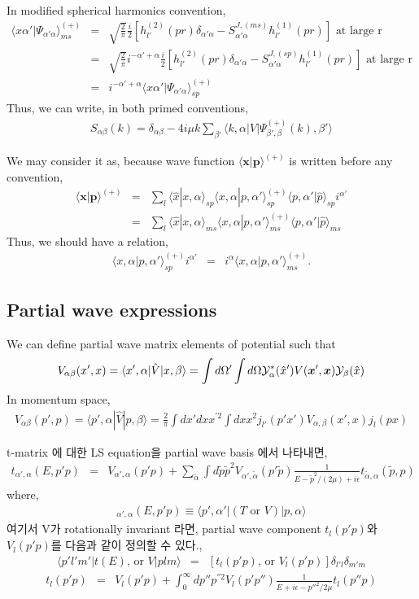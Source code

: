 \documentclass[10pt]{book}
\def\bm{\boldsymbol}
\newcommand{\bea}{\begin{eqnarray}}
\newcommand{\eea}{\end{eqnarray}}
\newcommand{\no}{\nonumber \\}
\def\vp{{\bm p}}
\def\vx{{\bm x}}
\def\la{\langle}
\def\ra{\rangle}
\begin{document}
\begin{itemize}
In modified spherical harmonics convention,
\bea
\la x \alpha'|\Psi_{\alpha'\alpha}\ra^{(+)}_{ms}
&=&\sqrt{\frac{2}{\pi}}
    \frac{i}{2}[h^{(2)}_{l'}(pr)\delta_{\alpha'\alpha}
                      -S^{J,(ms)}_{\alpha'\alpha} 
                      h^{(1)}_{l'}(pr)] 
                      \mbox{ at large r}\no
&=&\sqrt{\frac{2}{\pi}}
   i^{-\alpha'+\alpha} \frac{i}{2}
                  [h^{(2)}_{l'}(pr)\delta_{\alpha'\alpha}
                      -S^{J,(sp)}_{\alpha'\alpha} 
                      h^{(1)}_{l'}(pr)] 
                      \mbox{ at large r}\no
&=&i^{-\alpha'+\alpha}\la x \alpha'|\Psi_{\alpha'\alpha}\ra^{(+)}_{sp}
\eea
Thus, we can write, in both primed conventions,
\bea
S_{\alpha\beta}(k)=\delta_{\alpha\beta}-4i\mu k
 \sum_{\beta'}\la k, \alpha|V|\Psi^{(+)}_{\beta',\beta}(k),\beta'\ra
\eea

We may consider it as, because wave function 
$\la\vx|\vp\ra^{(+)}$ is written before any convention,
\bea
\la \vx|\vp\ra^{(+)}&=&\sum_{l}\la \hat{x}|x,\alpha\ra_{sp}
                     \la x,\alpha|p,\alpha'\ra^{(+)}_{sp}
                     \la p,\alpha'|\hat{p}\ra_{sp} i^{\alpha'}\no
                    &=&\sum_{l}\la \hat{x}|x,\alpha\ra_{ms}
                     \la x,\alpha|p,\alpha'\ra^{(+)}_{ms}
                     \la p,\alpha'|\hat{p}\ra_{ms}  
\eea
Thus, we should have a relation,
\bea
\la x,\alpha|p,\alpha'\ra^{(+)}_{sp}i^{\alpha'}
&=& i^{\alpha}\la x,\alpha|p,\alpha'\ra^{(+)}_{ms}.
\eea



\subsection{Partial wave expressions}
We can define partial wave matrix elements 
of potential such that
\bea 
V_{\alpha\beta}(x',x )
=\la x',\alpha|\hat{V}|x, \beta \ra
=\int d\Omega'\int d\Omega 
 {\cal Y}^*_{\alpha}(\hat{x}')V(\vx',\vx)
 {\cal Y}_{\beta}(\hat{x}) 
\eea 
In momentum space,
\bea 
V_{\alpha\beta}(p',p)
=\la p',\alpha|\hat{V}|p,\beta\ra 
=\frac{2}{\pi}\int d x' dx x^{'2} \int dx x^2
 j_{l'}(p' x') V_{\alpha,\beta }(x',x)
 j_{l}(px) 
\eea 

t-matrix 에 대한 LS equation을 partial wave basis 에서 나타내면, 
\bea
t_{\alpha ',\alpha}(E,p' p)
&=&V_{\alpha',\alpha}(p'p)
+\sum_{\tilde{\alpha}}\int d\tilde{p}\tilde{p}^2
 V_{\alpha',\tilde{\alpha}}(p'\tilde{p})
\frac{1}{E-\tilde{p}^2/(2\mu)+i\epsilon}
 t_{\tilde{\alpha},\alpha}(\tilde{p},p)
\eea
where,
\bea 
[t\mbox{ or } V]_{\alpha ',\alpha}(E,p' p)\equiv
\la p',\alpha'|(T\mbox{ or } V)|p,\alpha\ra
\eea
여기서 V가 rotationally invariant 라면, 
partial wave component $t_l(p'p)$와 $V_l(p'p)$를 다음과 같이 정의할 수 있다.,
\bea
\la p' l' m'|t(E)\mbox{, or }V |p l m\ra
&=&[t_l(p'p)\mbox{, or }V_l(p'p)]\delta_{l'l}\delta_{m'm}
\eea
\bea
t_l(p'p)&=&V_l(p'p)+\int_0^\infty dp'' p^{''2} V_l(p'p'')\frac{1}{E+i\epsilon-p''^2/2\mu}t_l(p''p)
\eea


\end{itemize}
\end{document}
